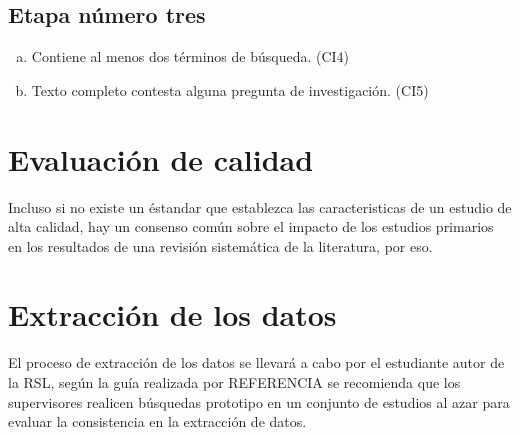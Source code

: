 \documentclass{article}
\begin{document}
\subsection{Etapa número tres}
\begin{enumerate}[(a)]
  \item{Contiene al menos dos términos de búsqueda. (CI4)}
  \item{Texto completo contesta alguna pregunta de investigación. (CI5)}
\end{enumerate}
\newpage

\section{Evaluación de calidad}
Incluso si no existe un éstandar que establezca las caracteristicas de un estudio 
de alta calidad, hay un consenso común sobre el impacto de los estudios primarios 
en los resultados de una revisión sistemática de la literatura, por eso. 

\begin{center}
\begin{table}[ht]
        \caption{Calidad} 
        \centering 
        \label{table:tablacalidad}
\end{table}
\end{center}

\newpage

\section{Extracción de los datos}
El proceso de extracción de los datos se llevará a cabo por el estudiante autor de la RSL, según la guía realizada por REFERENCIA 
se recomienda que los supervisores realicen búsquedas prototipo en un conjunto de estudios al azar para evaluar la consistencia
en la extracción de datos.
\end{document}
